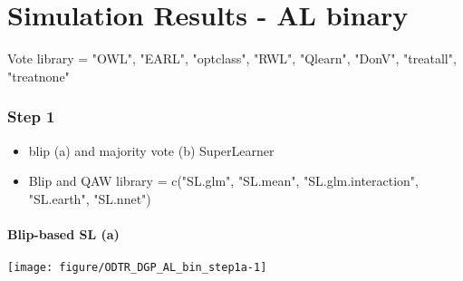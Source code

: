 \documentclass[11pt]{article}\usepackage[]{graphicx}\usepackage[]{color}
\makeatletter
\def\maxwidth{ %
  \ifdim\Gin@nat@width>\linewidth
    \linewidth
  \else
    \Gin@nat@width
  \fi
}
\makeatother
\begin{document}
\part*{Simulation Results - AL binary}

Vote library = "OWL", "EARL", "optclass", "RWL", "Qlearn", "DonV", "treatall", "treatnone"




\section{Step 1}

\begin{itemize}
\item blip (a) and majority vote (b) SuperLearner
\item Blip and QAW library = c("SL.glm", "SL.mean", "SL.glm.interaction", "SL.earth", "SL.nnet")
\end{itemize}




\subsection{Blip-based SL (a)}

\texttt{[image: figure/ODTR\_DGP\_AL\_bin\_step1a-1]} 
\begin{table}[ht]
\centering
{}
\caption{cont - step1a} 
\end{table}
\end{document}
